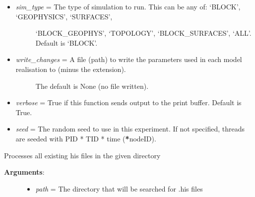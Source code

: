 \documentclass[a4paper,10pt,english]{sphinxmanual}
\begin{document}
\begin{fulllineitems}
\begin{fulllineitems}
\begin{description}
\begin{itemize}
\begin{description}
\end{description}

\end{itemize}

\end{description}
\begin{itemize}
\item {} \begin{description}
\item[{\emph{sim\_type} = The type of simulation to run. This can be any of: `BLOCK', `GEOPHYSICS', `SURFACES', }] \leavevmode
`BLOCK\_GEOPHYS', `TOPOLOGY', `BLOCK\_SURFACES', `ALL'. Default is `BLOCK'.

\end{description}

\item {} \begin{description}
\item[{\emph{write\_changes} = A file (path) to write the parameters used in each model realisation to (minus the extension). }] \leavevmode
The default is None (no file written).

\end{description}

\item {} 
\emph{verbose} = True if this function sends output to the print buffer. Default is True.

\item {} 
\emph{seed} = The random seed to use in this experiment. If not specified, threads are seeded with PID * TID * time ({\color{red}\bfseries{}*}nodeID).

\end{itemize}

\end{fulllineitems}


\begin{fulllineitems}
\label{pynoddy:pynoddy.experiment.MonteCarlo.MonteCarlo.generate_models_from_existing_histories}
Processes all existing his files in the given directory
\begin{description}
\item[{\textbf{Arguments}:}] \leavevmode\begin{itemize}
\item {} 
\emph{path} = The directory that will be searched for .his files


\end{itemize}
\end{description}
\end{fulllineitems}
\end{fulllineitems}
\end{document}
